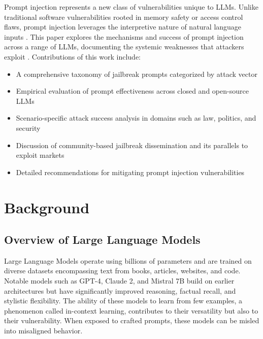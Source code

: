 \documentclass[conference]{IEEEtran}
\begin{document}
Prompt injection represents a new class of vulnerabilities unique to LLMs. Unlike traditional software vulnerabilities rooted in memory safety or access control flaws, prompt injection leverages the interpretive nature of natural language inputs \cite{rossi2024earlycategorization5}\cite{formalizing6}. This paper explores the mechanisms and success of prompt injection across a range of LLMs, documenting the systemic weaknesses that attackers exploit \cite{liu2024jailbreaking2}\cite{rahman2024finetuned7}\cite{hung2025attentiontracker8}.
\newline
Contributions of this work include:
\begin{itemize}
\item A comprehensive taxonomy of jailbreak prompts categorized by attack vector \cite{liu2024automatic3}\cite{formalizing6}
\item Empirical evaluation of prompt effectiveness across closed and open-source LLMs \cite{Benchmarking4}\cite{kokkula2024palisade10}\cite{chen2025secaligndefend11}
\item Scenario-specific attack success analysis in domains such as law, politics, and security \cite{liu2024promptinjection1}\cite{chen2025defenseprompt9}\cite{lin2025uniguardianunified13}
\item Discussion of community-based jailbreak dissemination and its parallels to exploit markets \cite{debenedetti2025defeating14}\cite{hackett2025bypassing15}\cite{bubeck2023sparksartificial27}
\item Detailed recommendations for mitigating prompt injection vulnerabilities \cite{rahman2024finetuned7}\cite{zhang2024goalguided12}\cite{llmapplications16}
\end{itemize}
\section{Background}

\subsection{Overview of Large Language Models}
Large Language Models operate using billions of parameters and are trained on diverse datasets encompassing text from books, articles, websites, and code. Notable models such as GPT-4, Claude 2, and Mistral 7B build on earlier architectures but have significantly improved reasoning, factual recall, and stylistic flexibility. The ability of these models to learn from few examples, a phenomenon called in-context learning, contributes to their versatility but also to their vulnerability. When exposed to crafted prompts, these models can be misled into misaligned behavior.
\end{document}
